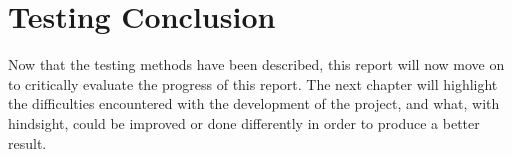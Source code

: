 \section{Testing Conclusion}

Now that the testing methods have been described, this report will now move on to critically evaluate the progress of this report. The next chapter will highlight the difficulties encountered with the development of the project, and what, with hindsight, could be improved or done differently in order to produce a better result.